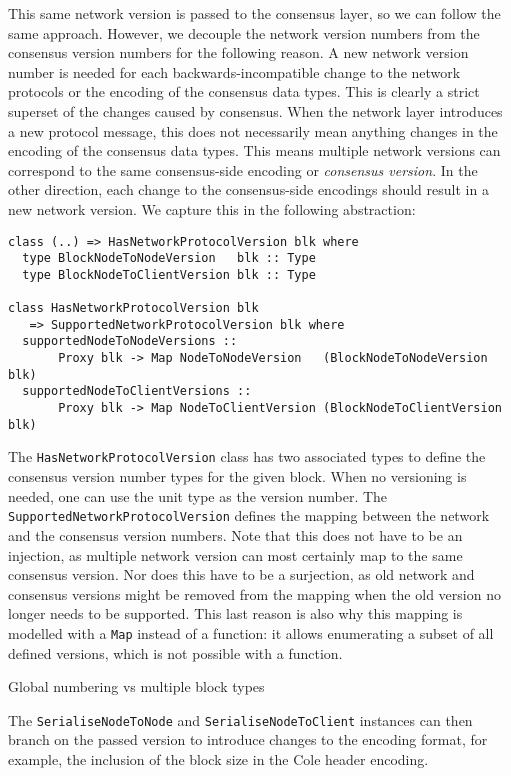 This same network version is passed to the consensus layer, so we can follow the
same approach. However, we decouple the network version numbers from the
consensus version numbers for the following reason. A new network version number
is needed for each backwards-incompatible change to the network protocols or the
encoding of the consensus data types. This is clearly a strict superset of the
changes caused by consensus. When the network layer introduces a new protocol
message, this does not necessarily mean anything changes in the encoding of the
consensus data types. This means multiple network versions can correspond to the
same consensus-side encoding or \emph{consensus version}. In the other
direction, each change to the consensus-side encodings should result in a new
network version. We capture this in the following abstraction:
\begin{lstlisting}
class (..) => HasNetworkProtocolVersion blk where
  type BlockNodeToNodeVersion   blk :: Type
  type BlockNodeToClientVersion blk :: Type

class HasNetworkProtocolVersion blk
   => SupportedNetworkProtocolVersion blk where
  supportedNodeToNodeVersions ::
       Proxy blk -> Map NodeToNodeVersion   (BlockNodeToNodeVersion   blk)
  supportedNodeToClientVersions ::
       Proxy blk -> Map NodeToClientVersion (BlockNodeToClientVersion blk)
\end{lstlisting}
The \lstinline!HasNetworkProtocolVersion! class has two associated types to
define the consensus version number types for the given block. When no
versioning is needed, one can use the unit type as the version number. The
\lstinline!SupportedNetworkProtocolVersion! defines the mapping between the
network and the consensus version numbers. Note that this does not have to be an
injection, as multiple network version can most certainly map to the same
consensus version. Nor does this have to be a surjection, as old network and
consensus versions might be removed from the mapping when the old version no
longer needs to be supported. This last reason is also why this mapping is
modelled with a \lstinline!Map! instead of a function: it allows enumerating a
subset of all defined versions, which is not possible with a function.

 Global numbering vs multiple block types

The \lstinline!SerialiseNodeToNode! and \lstinline!SerialiseNodeToClient!
instances can then branch on the passed version to introduce changes to the
encoding format, for example, the inclusion of the block size in the Cole
header encoding.

